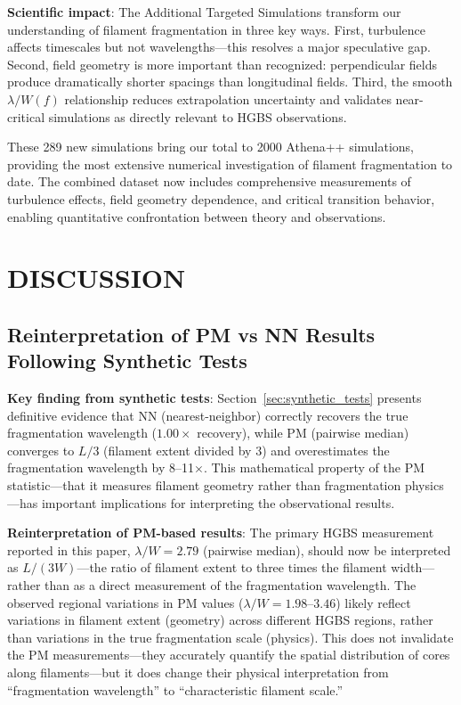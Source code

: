 \documentclass[twoside,twocolumn]{mnras}
\begin{document}
\textbf{Scientific impact}: The Additional Targeted Simulations transform our understanding of filament fragmentation in three key ways. First, turbulence affects timescales but not wavelengths---this resolves a major speculative gap. Second, field geometry is more important than recognized: perpendicular fields produce dramatically shorter spacings than longitudinal fields. Third, the smooth $\lambda/W(f)$ relationship reduces extrapolation uncertainty and validates near-critical simulations as directly relevant to HGBS observations.

These 289 new simulations bring our total to 2000 Athena++ simulations, providing the most extensive numerical investigation of filament fragmentation to date. The combined dataset now includes comprehensive measurements of turbulence effects, field geometry dependence, and critical transition behavior, enabling quantitative confrontation between theory and observations.

\section{DISCUSSION}

\subsection{Reinterpretation of PM vs NN Results Following Synthetic Tests}

\textbf{Key finding from synthetic tests}: Section~\ref{sec:synthetic_tests} presents definitive evidence that NN (nearest-neighbor) correctly recovers the true fragmentation wavelength ($1.00\times$ recovery), while PM (pairwise median) converges to $L/3$ (filament extent divided by 3) and overestimates the fragmentation wavelength by 8--11$\times$. This mathematical property of the PM statistic---that it measures filament geometry rather than fragmentation physics---has important implications for interpreting the observational results.

\textbf{Reinterpretation of PM-based results}: The primary HGBS measurement reported in this paper, $\lambda/W = 2.79$ (pairwise median), should now be interpreted as $L/(3W)$---the ratio of filament extent to three times the filament width---rather than as a direct measurement of the fragmentation wavelength. The observed regional variations in PM values ($\lambda/W = 1.98$--$3.46$) likely reflect variations in filament extent (geometry) across different HGBS regions, rather than variations in the true fragmentation scale (physics). This does not invalidate the PM measurements---they accurately quantify the spatial distribution of cores along filaments---but it does change their physical interpretation from ``fragmentation wavelength'' to ``characteristic filament scale.''
\end{document}
